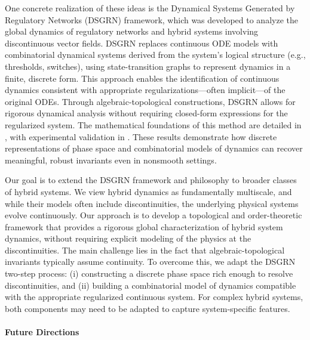 \documentclass[letterpaper,11pt]{article}
\begin{document}
One concrete realization of these ideas is the Dynamical Systems Generated by Regulatory Networks (DSGRN) framework, which was developed to analyze the global dynamics of regulatory networks and hybrid systems involving discontinuous vector fields.
DSGRN replaces continuous ODE models with combinatorial dynamical systems derived from the system’s logical structure (e.g., thresholds, switches), using state-transition graphs to represent dynamics in a finite, discrete form.
This approach enables the identification of continuous dynamics consistent with appropriate regularizations—often implicit—of the original ODEs.
Through algebraic-topological constructions, DSGRN allows for rigorous dynamical analysis without requiring closed-form expressions for the regularized system.
The mathematical foundations of this method are detailed in \cite{gameiro2024globaldynamicsordinarydifferential}, with experimental validation in \cite{kepley2024globalanalysisregulatorynetwork}.
These results demonstrate how discrete representations of phase space and combinatorial models of dynamics can recover meaningful, robust invariants even in nonsmooth settings.

Our goal is to extend the DSGRN framework and philosophy to broader classes of hybrid systems.
We view hybrid dynamics as fundamentally multiscale, and while their models often include discontinuities, the underlying physical systems evolve continuously.
Our approach is to develop a topological and order-theoretic framework that provides a rigorous global characterization of hybrid system dynamics, without requiring explicit modeling of the physics at the discontinuities.
The main challenge lies in the fact that algebraic-topological invariants typically assume continuity.
To overcome this, we adapt the DSGRN two-step process:
(i) constructing a discrete phase space rich enough to resolve discontinuities, and
(ii) building a combinatorial model of dynamics compatible with the appropriate regularized continuous system.
For complex hybrid systems, both components may need to be adapted to capture system-specific features.

\paragraph{Future Directions}
\end{document}
